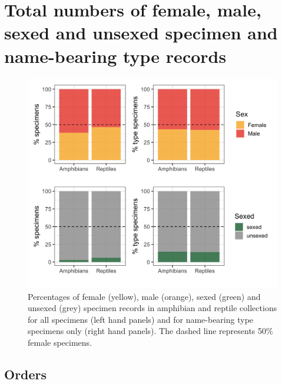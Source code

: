 \documentclass[a4paper, 12pt]{article}
\begin{document}
\newpage
\section{Total numbers of female, male, sexed and unsexed specimen and name-bearing type records}


\newpage

\begin{figure}[H]
 \centering
  \includegraphics[width = \linewidth]{figures/types-class.png}
  \caption{Percentages of female (yellow), male (orange), sexed (green) and unsexed (grey) specimen records in amphibian and reptile collections for all specimens (left hand panels) and for name-bearing type specimens only (right hand panels). 
  The dashed line represents 50\% female specimens.}
  \label{fig-types-class}
\end{figure}

\newpage
\subsection{Orders}
\end{document}

